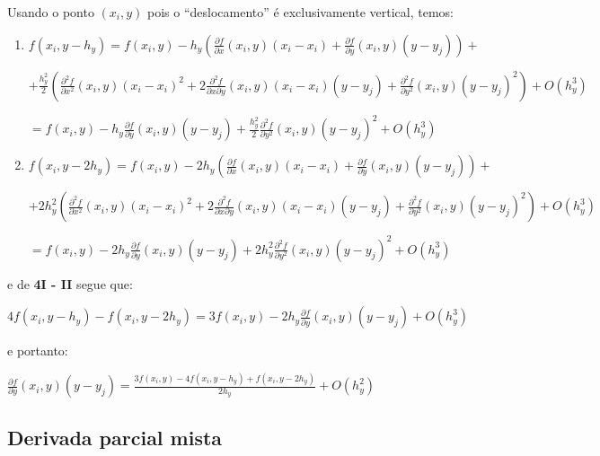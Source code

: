 \documentclass[11pt]{article}
\begin{document}
  \indent\indent Usando o ponto $(x_i, y)$ pois o ``deslocamento'' é exclusivamente vertical, temos:

  \begin{enumerate}[label=\textbf{\Roman*)}]
    \item $f(x_i, y - h_y) = f(x_i, y) - h_y\left(\frac{\partial f}{\partial x}\left(x_i, y \right)\left(x_i - x_i \right) + \frac{\partial f}{\partial y}\left(x_i, y \right)\left(y - y_j \right) \right) +$

    $+ \frac{h_y^2}{2}\left(\frac{\partial^2 f}{\partial x^2}\left(x_i, y\right)\left(x_i - x_i\right)^2 + 2\frac{\partial^2 f}{\partial x \partial y}\left(x_i, y \right)\left(x_i - x_i\right)\left(y - y_j\right) +
    \frac{\partial^2 f}{\partial y^2}\left(x_i, y\right)\left(y - y_j\right)^2 \right) + O(h_y^3)$

    $= f(x_i, y) - h_y\frac{\partial f}{\partial y}\left(x_i, y \right)\left(y - y_j \right) + \frac{h_y^2}{2}\frac{\partial^2 f}{\partial y^2}\left(x_i, y\right)\left(y - y_j\right)^2 + O(h_y^3)$


    \item $f(x_i, y - 2h_y) = f(x_i, y) - 2h_y\left(\frac{\partial f}{\partial x}\left(x_i, y \right)\left(x_i - x_i \right) + \frac{\partial f}{\partial y}\left(x_i, y \right)\left(y - y_j \right) \right) +$

    $+ 2h_y^2\left(\frac{\partial^2 f}{\partial x^2}\left(x_i, y\right)\left(x_i - x_i\right)^2 + 2\frac{\partial^2 f}{\partial x \partial y}\left(x_i, y \right)\left(x_i - x_i\right)\left(y - y_j\right) +
    \frac{\partial^2 f}{\partial y^2}\left(x_i, y\right)\left(y - y_j\right)^2 \right) + O(h_y^3)$

    $= f(x_i, y) - 2h_y\frac{\partial f}{\partial y}\left(x_i, y \right)\left(y - y_j \right) + 2h_y^2\frac{\partial^2 f}{\partial y^2}\left(x_i, y\right)\left(y - y_j\right)^2 + O(h_y^3)$
  \end{enumerate}

  e de \textbf{4I - II} segue que:

  $4f(x_i, y - h_y) - f(x_i, y - 2h_y) = 3f(x_i, y) - 2h_y\frac{\partial f}{\partial y}\left(x_i, y \right)\left(y - y_j \right) + O(h_y^3)$

  e portanto:

  $\frac{\partial f}{\partial y}\left(x_i, y \right)\left(y - y_j \right) = \frac{3f(x_i, y) - 4f(x_i, y - h_y) + f(x_i, y - 2h_y)}{2h_y}  + O(h_y^2)$


  \subsection{Derivada parcial mista}
\end{document}
